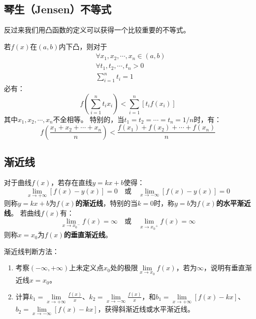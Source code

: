\subsection{琴生（Jensen）不等式}

\begin{tcolorbox}
反过来我们用凸函数的定义可以获得一个比较重要的不等式。
\end{tcolorbox}

\begin{definition}
若$f\left( x \right) $在$\left( a,b \right) $内下凸，则对于
\begin{align*}
&\forall x_1,x_2,\cdots ,x_n\in \left( a,b \right) \\
&\forall t_1,t_2,\cdots ,t_n>0 \\
&\sum_{i=1}^n{t_i}=1
\end{align*}
必有：
\[
f\left( \sum_{i=1}^n{t_ix_i} \right) <\sum_{i=1}^n{\left[ t_if\left( x_i \right) \right]}
\]
其中$x_1,x_2,\cdots ,x_n$不全相等。
特别的，当$t_1=t_2=\cdots =t_n=1/n$时，有：
\[
f\left( \frac{x_1+x_2+\cdots +x_n}{n} \right) <\frac{f\left( x_1 \right) +f\left( x_2 \right) +\cdots +f\left( x_n \right)}{n}
\]
\end{definition}

\subsection{渐近线}

\begin{definition}[函数的渐近线]
对于曲线$f\left( x \right) $，若存在直线$y=kx+b$使得：
\[
\underset{x\rightarrow +\infty}{\lim}\left[ f\left( x \right) -y\left( x \right) \right] =0 \quad \text{或} \quad \underset{x\rightarrow -\infty}{\lim}\left[ f\left( x \right) -y\left( x \right) \right] =0
\]
则称$y=kx+b$为{\bf $f\left( x \right) $的渐近线}，特别的当$k=0$时，称$y=b$为{\bf $f\left( x \right) $的水平渐近线}。
若曲线$f\left( x \right) $有：
\[
\underset{x\rightarrow {x_0}^-}{\lim}f\left( x \right) =\infty  \quad \text{或} \quad \underset{x\rightarrow {x_0}^+}{\lim}f\left( x \right) =\infty
\]
则称$x=x_0$为{\bf $f\left( x \right) $的垂直渐近线}。
\end{definition}

渐近线判断方法：
\begin{enumerate}
    \item 考察$\left( -\infty ,+\infty \right) $上未定义点$x_0$处的极限$\underset{x\rightarrow x_0}{\lim}f\left( x \right) $，若为$\infty $，说明有垂直渐近线$x=x_0$。
    \item 计算$k_1=\underset{x\rightarrow +\infty}{\lim}\frac{f\left( x \right)}{x}$、$k_2=\underset{x\rightarrow -\infty}{\lim}\frac{f\left( x \right)}{x}$，和$b_1=\underset{x\rightarrow +\infty}{\lim}\left[ f\left( x \right) -kx \right] $、$b_2=\underset{x\rightarrow -\infty}{\lim}\left[ f\left( x \right) -kx \right] $，获得斜渐近线或水平渐近线。
\end{enumerate}

